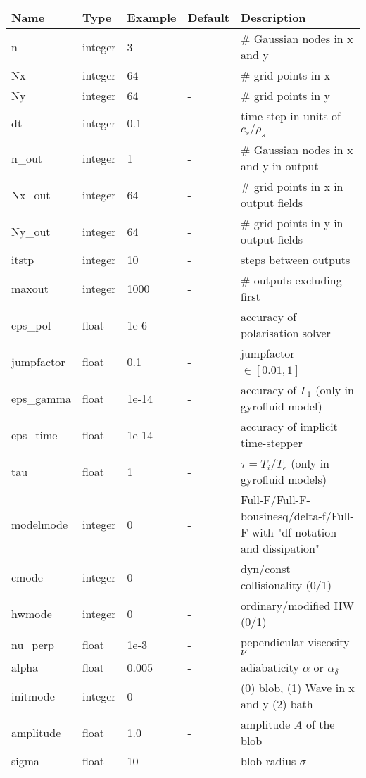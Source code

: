 \begin{longtable}{llll>{\RaggedRight}p{7cm}}
\toprule
\rowcolor{gray!50}\textbf{Name} &  \textbf{Type} & \textbf{Example} & \textbf{Default} & \textbf{Description}  \\ \midrule
n      & integer & 3 & - &\# Gaussian nodes in x and y \\
Nx     & integer &64& - &\# grid points in x \\
Ny     & integer &64& - &\# grid points in y \\
dt     & integer &0.1& - &time step in units of $c_s/\rho_s$ \\
n\_out  & integer &1  & - &\# Gaussian nodes in x and y in output \\
Nx\_out & integer &64& - &\# grid points in x in output fields \\
Ny\_out & integer &64& - &\# grid points in y in output fields \\
itstp  & integer &10  & - &   steps between outputs \\
maxout & integer &1000& - &      \# outputs excluding first \\
eps\_pol   & float &1e-6   & - &  accuracy of polarisation solver \\
jumpfactor & float &0.1    & - &  jumpfactor $\in \left[0.01,1\right]$\ \\
eps\_gamma & float &1e-14  & - & accuracy of $\Gamma_1$ (only in gyrofluid model) \\
eps\_time  & float &1e-14  & - & accuracy of implicit time-stepper \\
tau        & float &1      & - & $\tau = T_i/T_e$ (only in gyrofluid models) \\
modelmode  & integer &0   & - & Full-F/Full-F-bousinesq/delta-f/Full-F with "df notation and dissipation" \\
cmode      & integer &0   & - & dyn/const collisionality (0/1) \\
hwmode     & integer &0   & - & ordinary/modified HW (0/1) \\
nu\_perp   & float &1e-3  & - & pependicular viscosity $\nu$ \\
alpha      & float &0.005  & - & adiabaticity $\alpha$ or $\alpha_\delta$ \\
initmode   & integer &0    & - & (0) blob, (1) Wave in x and y (2) bath\\
amplitude  & float &1.0    & - & amplitude $A$ of the blob \\
sigma      & float &10     & - & blob radius $\sigma$ \\

\end{longtable}
